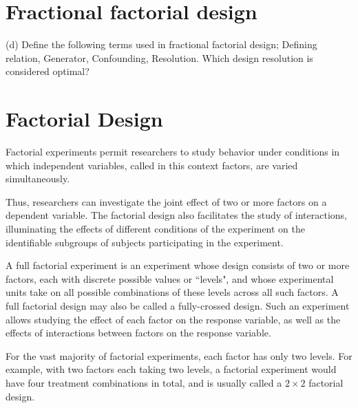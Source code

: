 

\section{Fractional factorial design}

(d)	Define the following terms used in fractional factorial design; Defining relation,
Generator, Confounding, Resolution. Which design resolution is considered
optimal?
\section{Factorial Design}
Factorial experiments permit researchers to study behavior under conditions in which independent variables, called in this context factors, are varied simultaneously.

Thus, researchers can investigate the joint effect of two or more factors on a dependent variable. The factorial design also facilitates the study of interactions, illuminating the effects of different conditions of the experiment on the identifiable subgroups of subjects participating in the experiment.


A full factorial experiment is an experiment whose design consists of two or more factors, each with discrete possible values or ``levels", and whose experimental units take on all possible combinations of these levels across all such factors. A full factorial design may also be called a fully-crossed design. Such an experiment allows studying the effect of each factor on the response variable, as well as the effects of interactions between factors on the response variable.

For the vast majority of factorial experiments, each factor has only two levels. For example, with two factors each taking two levels, a factorial experiment would have four treatment combinations in total, and is usually called a $2\times2$ factorial design.

\newpage

